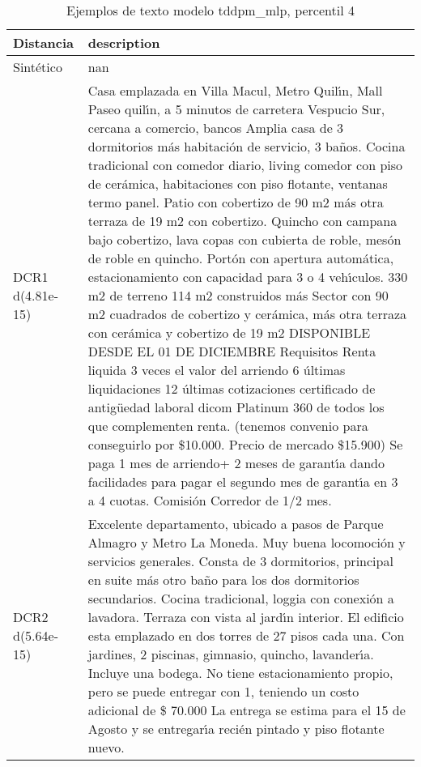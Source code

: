 \begin{table}[H]
\centering
\fontsize{10}{14}\selectfont
\caption{Ejemplos de texto modelo tddpm\_mlp, percentil 4}
\label{table-example-economicos-b-2-tddpm_mlp-4p-text}
\begin{tabular}{|l|m{35em}|}
\hline
\rowcolor[gray]{0.8}
Distancia & description \\
\hline Sintético & nan \\
\hline DCR1 d(4.81e-15) & Casa emplazada en Villa Macul, Metro Quil{\'\i}n, Mall Paseo quil{\'\i}n, a 5 minutos de carretera Vespucio Sur, cercana a comercio, bancos Amplia casa de 3 dormitorios m\'as habitaci\'on de servicio, 3 ba\~nos. Cocina tradicional con comedor diario, living comedor con piso de cer\'amica, habitaciones con piso flotante, ventanas termo panel. Patio con cobertizo de 90 m2 m\'as otra terraza de 19 m2 con cobertizo. Quincho con campana bajo cobertizo, lava copas con cubierta de roble, mes\'on de roble en quincho. Port\'on con apertura autom\'atica, estacionamiento con capacidad para 3 o 4 veh{\'\i}culos.   330 m2 de terreno 114 m2 construidos m\'as Sector con 90 m2 cuadrados de cobertizo y cer\'amica, m\'as otra terraza con cer\'amica y cobertizo de 19 m2  DISPONIBLE DESDE EL 01 DE DICIEMBRE  Requisitos Renta liquida 3 veces el valor del arriendo 6 \'ultimas liquidaciones 12 \'ultimas cotizaciones certificado de antig\"uedad laboral  dicom Platinum 360 de todos los que complementen renta. (tenemos convenio para conseguirlo por \$10.000. Precio de mercado \$15.900)  Se paga 1 mes de arriendo+ 2 meses de garant{\'\i}a dando facilidades para pagar el segundo mes de garant{\'\i}a en 3 a 4 cuotas. Comisi\'on Corredor de 1/2 mes. \\
\hline DCR2 d(5.64e-15) & Excelente departamento, ubicado a pasos de Parque Almagro y Metro La Moneda. Muy buena locomoci\'on y servicios generales. Consta de 3 dormitorios, principal en suite m\'as otro ba\~no para los dos dormitorios secundarios. Cocina tradicional, loggia con conexi\'on a lavadora.  Terraza con vista al jard{\'\i}n interior. El edificio esta emplazado en dos torres de 27 pisos cada una. Con jardines, 2 piscinas, gimnasio, quincho, lavander{\'\i}a. Incluye una bodega. No tiene estacionamiento propio, pero se puede entregar con 1, teniendo un costo adicional de \$ 70.000 La entrega se estima para el 15 de Agosto y se entregar{\'\i}a reci\'en pintado y piso flotante nuevo. \\
\hline
\end{tabular}
\end{table}
